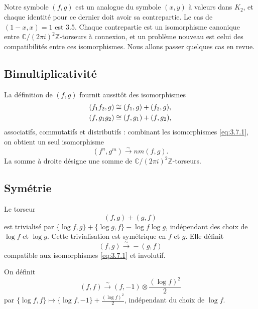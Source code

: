 \documentclass[12pt,a4paper]{article}
\theoremstyle{plain}
\theoremstyle{definition}
\theoremstyle{remark}
\newcommand{\Z}{\mathbb{Z}}
\newcommand{\C}{\mathbb{C}}
\begin{document}
\subsection{}

Notre symbole $(f,g)$ est un analogue du symbole $(x,y)$ à valeurs dans $K_2$,
et chaque identité pour ce dernier doit avoir sa contrepartie. Le cas de $(1-x, x) = 1$
est 3.5. Chaque contrepartie est un isomorphisme canonique entre $\C/(2\pi i)^2\Z$-torseurs
à connexion, et un problème nouveau est celui des compatibilités entre ces isomorphismes.
Nous allons passer quelques cas en revue.

\subsection{Bimultiplicativité}

La définition de $(f,g)$ fournit aussitôt des isomorphismes
\begin{align}
(f_1 f_2, g) &\cong (f_1, g) + (f_2, g), \label{eq:3.7.1} \\
(f, g_1 g_2) &\cong (f, g_1) + (f, g_2), \notag
\end{align}
associatifs, commutatifs et distributifs : combinant les isomorphismes \eqref{eq:3.7.1}, on obtient
un seul isomorphisme
\[
(f^n, g^m) \xrightarrow{\sim} nm(f, g).
\]
La somme à droite désigne une somme de $\C/(2\pi i)^2\Z$-torseurs.

\subsection{Symétrie}

Le torseur
\begin{equation}\label{eq:3.8.1}
(f,g) + (g,f)
\end{equation}
est trivialisé par $\{\log f, g\} + \{\log g, f\} - \log f \log g$, indépendant des choix de $\log f$
et $\log g$. Cette trivialisation est symétrique en $f$ et $g$. Elle définit
\begin{equation}\label{eq:3.8.2}
(f,g) \xrightarrow{\sim} -(g,f)
\end{equation}
compatible aux isomorphismes \eqref{eq:3.7.1} et involutif.

On définit
\begin{equation}\label{eq:3.8.3}
(f,f) \xrightarrow{\sim} (f, -1) \otimes \frac{(\log f)^2}{2}
\end{equation}
par $\{\log f, f\} \mapsto \{\log f, -1\} + \frac{(\log f)^2}{2}$, indépendant du choix de $\log f$.
\end{document}
